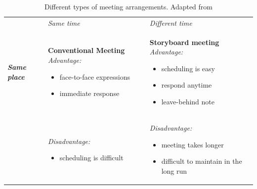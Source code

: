 \begin{table}[!htb]
\caption[Different types of meeting arrangements]{Different types of meeting arrangements. Adapted from \cite{jankowskiGISGroupDecision2001}}
\label{table:meeting_arrangements}
\begin{center}
\footnotesize
\begin{tabular}{ L{2cm} L{6cm}  L{6cm}}  \hline
 & \textit{Same time} &\textit{Different time}  \\ 
\textbf{\textit{Same place}} & \textbf{Conventional Meeting} \qquad \textit{Advantage:} 
\vspace{-3mm}
\begin{itemize}[itemsep=0pt,parsep=0pt]
    \setlength{\itemsep}{0pt}%
    \setlength{\parskip}{0pt}%
	\item{face-to-face expressions}
	\item{immediate response}
\end{itemize} &
\textbf{Storyboard meeting} \qquad \textit{Advantage:}
\vspace{-3mm} 
\begin{itemize}[itemsep=0pt,parsep=0pt]
    \setlength{\itemsep}{0pt}%
    \setlength{\parskip}{0pt}%
	\item{scheduling is easy}
	\item{respond anytime}
	\item{leave-behind note}
\end{itemize} 
\\
& \textit{Disadvantage:} 
\vspace{-3mm}
\begin{itemize}[itemsep=0pt,parsep=0pt]
    \setlength{\itemsep}{0pt}%
    \setlength{\parskip}{0pt}%
	\item{scheduling is difficult}
\end{itemize} &
\textit{Disadvantage:} 
\vspace{-3mm}
\begin{itemize}[itemsep=0pt,parsep=0pt]
    \setlength{\itemsep}{0pt}%
    \setlength{\parskip}{0pt}%
	\item{meeting takes longer}
	\item{difficult to maintain in the long run}
\end{itemize} 
\\ \hline


\end{tabular}
\end{center}
\end{table}

